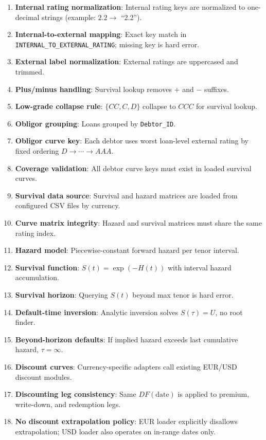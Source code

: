 \documentclass[11pt]{article}
\begin{document}
\begin{enumerate}[label=\arabic*),leftmargin=*,align=left]
\item \textbf{Internal rating normalization}: Internal rating keys are normalized to one-decimal strings (example: \(2.2 \rightarrow\) ``2.2'').
\item \textbf{Internal-to-external mapping}: Exact key match in \texttt{INTERNAL\_TO\_EXTERNAL\_RATING}; missing key is hard error.
\item \textbf{External label normalization}: External ratings are uppercased and trimmed.
\item \textbf{Plus/minus handling}: Survival lookup removes \(+\) and \(-\) suffixes.
\item \textbf{Low-grade collapse rule}: \(\{CC, C, D\}\) collapse to \(CCC\) for survival lookup.
\item \textbf{Obligor grouping}: Loans grouped by \texttt{Debtor\_ID}.
\item \textbf{Obligor curve key}: Each debtor uses worst loan-level external rating by fixed ordering \(D \rightarrow \cdots \rightarrow AAA\).
\item \textbf{Coverage validation}: All debtor curve keys must exist in loaded survival curves.

\item \textbf{Survival data source}: Survival and hazard matrices are loaded from configured CSV files by currency.
\item \textbf{Curve matrix integrity}: Hazard and survival matrices must share the same rating index.
\item \textbf{Hazard model}: Piecewise-constant forward hazard per tenor interval.
\item \textbf{Survival function}: \(S(t)=\exp(-H(t))\) with interval hazard accumulation.
\item \textbf{Survival horizon}: Querying \(S(t)\) beyond max tenor is hard error.
\item \textbf{Default-time inversion}: Analytic inversion solves \(S(\tau)=U\), no root finder.
\item \textbf{Beyond-horizon defaults}: If implied hazard exceeds last cumulative hazard, \(\tau=\infty\).

\item \textbf{Discount curves}: Currency-specific adapters call existing EUR/USD discount modules.
\item \textbf{Discounting leg consistency}: Same \(DF(\text{date})\) is applied to premium, write-down, and redemption legs.
\item \textbf{No discount extrapolation policy}: EUR loader explicitly disallows extrapolation; USD loader also operates on in-range dates only.


\end{enumerate}
\end{document}
